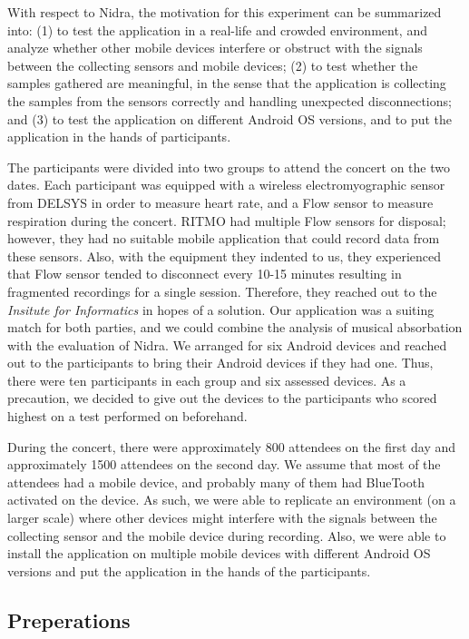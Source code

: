 With respect to Nidra, the motivation for this experiment can be summarized into: (1) to test the application in a real-life and crowded environment, and analyze whether other mobile devices interfere or obstruct with the signals between the collecting sensors and mobile devices; (2) to test whether the samples gathered are meaningful, in the sense that the application is collecting the samples from the sensors correctly and handling unexpected disconnections; and (3) to test the application on different Android OS versions, and to put the application in the hands of participants. 

The participants were divided into two groups to attend the concert on the two dates. Each participant was equipped with a wireless electromyographic sensor from DELSYS in order to measure heart rate, and a Flow sensor to measure respiration during the concert. RITMO had multiple Flow sensors for disposal; however, they had no suitable mobile application that could record data from these sensors. Also, with the equipment they indented to us, they experienced that Flow sensor tended to disconnect every 10-15 minutes resulting in fragmented recordings for a single session. Therefore, they reached out to the \textit{Insitute for Informatics} in hopes of a solution. Our application was a suiting match for both parties, and we could combine the analysis of musical absorbation with the evaluation of Nidra. We arranged for six Android devices and reached out to the participants to bring their Android devices if they had one. Thus, there were ten participants in each group and six assessed devices. As a precaution, we decided to give out the devices to the participants who scored highest on a test performed on beforehand.

During the concert, there were approximately 800 attendees on the first day and approximately 1500 attendees on the second day. We assume that most of the attendees had a mobile device, and probably many of them had BlueTooth activated on the device. As such, we were able to replicate an environment (on a larger scale) where other devices might interfere with the signals between the collecting sensor and the mobile device during recording. Also, we were able to install the application on multiple mobile devices with different Android OS versions and put the application in the hands of the participants. 

\subsection{Preperations}

